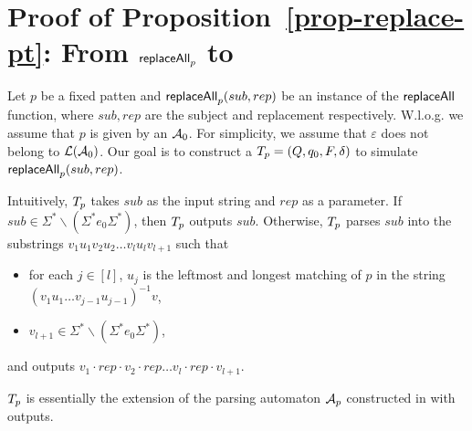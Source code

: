 
\section{Proof of Proposition~\ref{prop-replace-pt}: From $\mathsf{replaceAll}_p$ to \PT}

Let $p$ be a fixed patten and $\mathsf{replaceAll}_p(sub, rep)$ be an instance of the $\mathsf{replaceAll}$ function, where $sub, rep$ are the subject and replacement respectively. W.l.o.g. we assume that $p$ is given by an \FA{} $\mathcal{A}_0$. For simplicity, we assume that $\varepsilon$ does not belong to $\mathcal{L}(\mathcal{A}_0)$. Our goal is to construct a \PT{} $T_p = (Q, q_0, F, \delta)$ to simulate $\mathsf{replaceAll}_p(sub, rep)$.

Intuitively, $T_p$ takes $sub$ as the input string and $rep$ as a parameter. If $sub \in \Sigma^* \backslash (\Sigma^\ast e_0 \Sigma^\ast)$, then $T_p$ outputs $sub$. Otherwise, $T_p$ parses $sub$ into the substrings $v_1 u_1 v_2 u_2 \ldots v_l u_l v_{l+1}$ such that
\begin{itemize}
	\item for each $j \in [l]$, $u_j$ is the leftmost and longest matching of $p$ in the string $(v_1 u_1 \ldots v_{j-1} u_{j-1})^{-1} v$,
	\item $v_{l+1} \in \Sigma^* \backslash (\Sigma^\ast e_0 \Sigma^\ast)$,
\end{itemize}
and outputs $v_1\cdot rep \cdot v_2 \cdot rep \ldots v_l \cdot rep \cdot v_{l+1}$. 

$T_p$ is essentially the extension of the parsing automaton $\mathcal{A}_p$ constructed in \cite{CCHLW18} with outputs.

